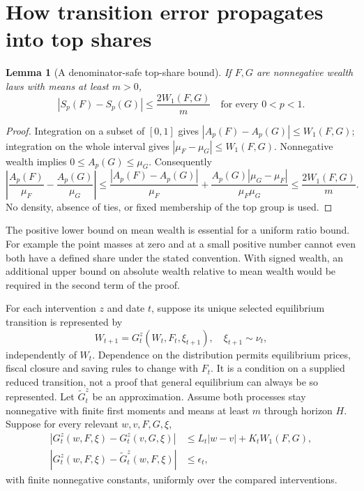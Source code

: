 \documentclass[11pt]{article}
\newtheorem{lemma}[theorem]{Lemma}
\theoremstyle{remark}
\begin{document}
\section{How transition error propagates into top shares}
\begin{lemma}[A denominator-safe top-share bound]
If $F,G$ are nonnegative wealth laws with means at least $m>0$,
\[
 |S_p(F)-S_p(G)|\leq \frac{2W_1(F,G)}m
 \quad\text{for every }0<p<1. \tag{2}
\]
\end{lemma}
\begin{proof}
Integration on a subset of $[0,1]$ gives
$|A_p(F)-A_p(G)|\leq W_1(F,G)$; integration on the whole interval gives
$|\mu_F-\mu_G|\leq W_1(F,G)$. Nonnegative wealth implies
$0\leq A_p(G)\leq\mu_G$. Consequently
\[
 \left|\frac{A_p(F)}{\mu_F}-\frac{A_p(G)}{\mu_G}\right|
 \leq\frac{|A_p(F)-A_p(G)|}{\mu_F}
 +\frac{A_p(G)|\mu_G-\mu_F|}{\mu_F\mu_G}
 \leq\frac{2W_1(F,G)}m.
\]
No density, absence of ties, or fixed membership of the top group is used.
\end{proof}
The positive lower bound on mean wealth is essential for a uniform
ratio bound. For example the point masses at zero and at a small positive
number cannot even both have a defined share under the stated convention.
With signed wealth, an additional upper bound on absolute wealth relative
to mean wealth would be required in the second term of the proof.

For each intervention $z$ and date $t$, suppose its unique selected
equilibrium transition is represented by
\[
 W_{t+1}=G_t^z(W_t,F_t,\xi_{t+1}),\quad \xi_{t+1}\sim\nu_t,
 \tag{3}
\]
independently of $W_t$. Dependence on the distribution permits equilibrium prices,
fiscal closure and saving rules to change with $F_t$. It is a condition
on a supplied reduced transition, not a proof that general equilibrium
can always be so represented. Let $\widetilde G_t^z$ be an approximation.
Assume both processes stay nonnegative with finite first moments and means
at least $m$ through horizon $H$. Suppose for every relevant $w,v,F,G,\xi$,
\begin{align}
 |G_t^z(w,F,\xi)-G_t^z(v,G,\xi)|
 &\leq L_t|w-v|+K_tW_1(F,G),\tag{4}\\
 |G_t^z(w,F,\xi)-\widetilde G_t^z(w,F,\xi)|&\leq\epsilon_t,
 \tag{5}
\end{align}
with finite nonnegative constants, uniformly over the compared interventions.
\end{document}
